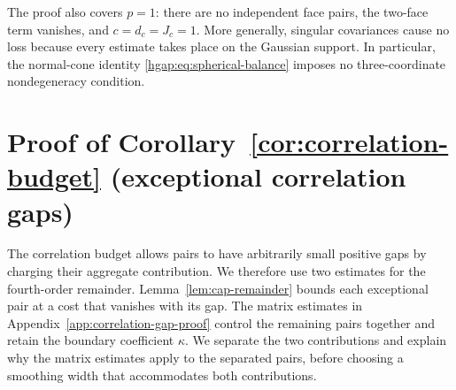 \documentclass[11pt,letterpaper,twoside,leqno]{article}
\theoremstyle{bookplain}
\theoremstyle{bookremark}
\begin{document}
The proof also covers $p=1$: there are no independent face pairs, the
two-face term vanishes, and $c=d_c=J_c=1$. More generally, singular
covariances cause no loss because every estimate takes place on the
Gaussian support. In particular, the normal-cone identity
\eqref{hgap:eq:spherical-balance} imposes no three-coordinate
nondegeneracy condition.


\clearpage
\section{Proof of Corollary~\ref*{cor:correlation-budget} (exceptional correlation gaps)}
\label{app:correlation-budget}

The correlation budget allows pairs to have arbitrarily small
positive gaps by charging their aggregate contribution. We therefore use two estimates for the fourth-order
remainder. Lemma~\ref{lem:cap-remainder} bounds each exceptional pair
at a cost that vanishes with its gap. The matrix estimates in
Appendix~\ref{app:correlation-gap-proof} control the remaining pairs
together and retain the boundary coefficient $\kappa$. We separate
the two contributions and explain why the matrix estimates apply to
the separated pairs, before choosing a smoothing width that
accommodates both contributions.
\end{document}
